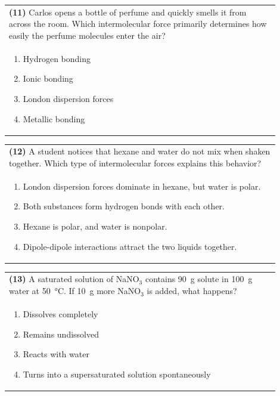 \documentclass{article}
\begin{document}
{{\vspace{0.2cm}
\noindent\begin{tabular}{|p{0.9\linewidth}|}
\hline
\textbf{(11)} Carlos opens a bottle of perfume and quickly smells it from across the room. Which intermolecular force primarily determines how easily the perfume molecules enter the air?\\[0.2cm]
\begin{minipage}[t]{0.85\linewidth}
\begin{enumerate}[label=\alph*.]
\item Hydrogen bonding
\item Ionic bonding
\item London dispersion forces
\item Metallic bonding
\end{enumerate}
\end{minipage}\\[0.2cm]
\hline
\end{tabular}

\vspace{0.2cm}
\noindent\begin{tabular}{|p{0.9\linewidth}|}
\hline
\textbf{(12)} A student notices that hexane and water do not mix when shaken together. Which type of intermolecular forces explains this behavior?\\[0.2cm]
\begin{minipage}[t]{0.85\linewidth}
\begin{enumerate}[label=\alph*.]
\item London dispersion forces dominate in hexane, but water is polar.
\item Both substances form hydrogen bonds with each other.
\item Hexane is polar, and water is nonpolar.
\item Dipole-dipole interactions attract the two liquids together.
\end{enumerate}
\end{minipage}\\[0.2cm]
\hline
\end{tabular}
\newpage

\vspace{0.2cm}
\noindent\begin{tabular}{|p{0.9\linewidth}|}
\hline
\textbf{(13)} A saturated solution of NaNO$_3$ contains 90~g solute in 100~g water at 50~°C. If 10~g more NaNO$_3$ is added, what happens?\\[0.2cm]
\begin{minipage}[t]{0.85\linewidth}
\begin{enumerate}[label=\alph*.]
\item Dissolves completely
\item Remains undissolved
\item Reacts with water
\item Turns into a supersaturated solution spontaneously
\end{enumerate}
\end{minipage}\\[0.2cm]
\hline
\end{tabular}

}}
\end{document}

